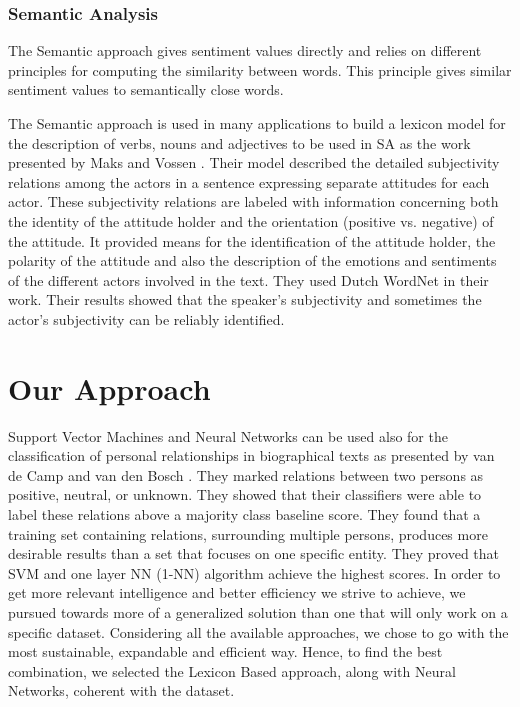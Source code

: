 \subsubsection{Semantic Analysis}
The Semantic approach gives sentiment values directly and relies on different principles for computing the similarity between words. This principle gives similar sentiment values to semantically close words.

The Semantic approach is used in many applications to build a lexicon model for the description of verbs, nouns and adjectives to be used in SA as the work presented by Maks and Vossen \cite{maks2012lexicon}. Their model described the detailed subjectivity relations among the actors in a sentence expressing separate attitudes for each actor. These subjectivity relations are labeled with information concerning both the identity of the attitude holder and the orientation (positive vs. negative) of the attitude. It provided means for the identification of the attitude holder, the polarity of the attitude and also the description of the emotions and sentiments of the different actors involved in the text. They used Dutch WordNet in their work. Their results showed that the speaker’s subjectivity and sometimes the actor’s subjectivity can be reliably identified.


\section{Our Approach}
Support Vector Machines and Neural Networks can be used also for the classification of personal relationships in biographical texts as presented by van de Camp and van den Bosch \cite{van2012socialist}. They marked relations between two persons as positive, neutral, or unknown. They showed that their classifiers were able to label these relations above a majority class baseline score. They found that a training set containing relations, surrounding multiple persons, produces more desirable results than a set that focuses on one specific entity. They proved that SVM and one layer NN (1-NN) algorithm achieve the highest scores.
In order to get more relevant intelligence and better efficiency we strive to achieve, we pursued towards more of a generalized solution than one that will only work on a specific dataset.\newline
Considering all the available approaches, we chose to go with the most sustainable, expandable and efficient way. Hence, to find the best combination, we selected the Lexicon Based approach, along with Neural Networks, coherent with the dataset.